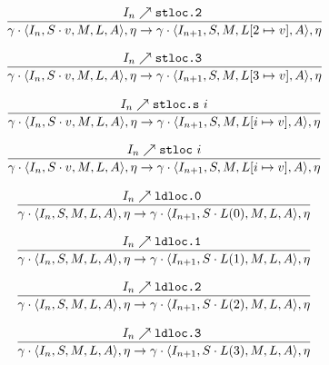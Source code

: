 \documentclass{article}
\numberwithin{equation}{section}
\newcommand{\mstate}[5] {
	\langle#1, #2, #3, #4, #5\rangle
}
\newcommand{\ipointsto}[3] {
	#1 \nearrow \texttt{#2} \text{ } #3
}
\newcommand{\setarrayitem}[3] {
	#1[#2 \mapsto #3]
}
\begin{document}
\begin{equation}
\label{eq:semantics_stloc2}
	\infer{
		\gamma \cdot \mstate{I_n}{S \cdot v}{M}{L}{A}, \eta
			\rightarrow
		\gamma \cdot \mstate{I_{n+1}}{S}{M}{\setarrayitem{L}{2}{v}}{A}, \eta
	}
	{\ipointsto{I_n}{stloc.2}}
\end{equation}

\begin{equation}
\label{eq:semantics_stloc3}
	\infer{
		\gamma \cdot \mstate{I_n}{S \cdot v}{M}{L}{A}, \eta
			\rightarrow
		\gamma \cdot \mstate{I_{n+1}}{S}{M}{\setarrayitem{L}{3}{v}}{A}, \eta
	}
	{\ipointsto{I_n}{stloc.3}}
\end{equation}

\begin{equation}
\label{eq:semantics_stlocs}
	\infer{
		\gamma \cdot \mstate{I_n}{S \cdot v}{M}{L}{A}, \eta
			\rightarrow
		\gamma \cdot \mstate{I_{n+1}}{S}{M}{\setarrayitem{L}{i}{v}}{A}, \eta
	}
	{\ipointsto{I_n}{stloc.s}{i}}
\end{equation}

\begin{equation}
\label{eq:semantics_stloc}
	\infer{
		\gamma \cdot \mstate{I_n}{S \cdot v}{M}{L}{A}, \eta
			\rightarrow
		\gamma \cdot \mstate{I_{n+1}}{S}{M}{\setarrayitem{L}{i}{v}}{A}, \eta
	}
	{\ipointsto{I_n}{stloc}{i}}
\end{equation}

\begin{equation}
\label{eq:semantics_ldloc0}
	\infer{
		\gamma \cdot \mstate{I_n}{S}{M}{L}{A}, \eta
			\rightarrow
		\gamma \cdot \mstate{I_{n+1}}{S \cdot L(0)}{M}{L}{A}, \eta
	}
	{\ipointsto{I_n}{ldloc.0}}
\end{equation}

\begin{equation}
\label{eq:semantics_ldloc1}
	\infer{
		\gamma \cdot \mstate{I_n}{S}{M}{L}{A}, \eta
			\rightarrow
		\gamma \cdot \mstate{I_{n+1}}{S \cdot L(1)}{M}{L}{A}, \eta
	}
	{\ipointsto{I_n}{ldloc.1}}
\end{equation}

\begin{equation}
\label{eq:semantics_ldloc2}
	\infer{
		\gamma \cdot \mstate{I_n}{S}{M}{L}{A}, \eta
			\rightarrow
		\gamma \cdot \mstate{I_{n+1}}{S \cdot L(2)}{M}{L}{A}, \eta
	}
	{\ipointsto{I_n}{ldloc.2}}
\end{equation}

\begin{equation}
\label{eq:semantics_ldloc3}
	\infer{
		\gamma \cdot \mstate{I_n}{S}{M}{L}{A}, \eta
			\rightarrow
		\gamma \cdot \mstate{I_{n+1}}{S \cdot L(3)}{M}{L}{A}, \eta
	}
	{\ipointsto{I_n}{ldloc.3}}
\end{equation}
\end{document}
